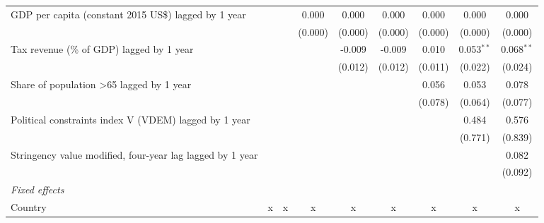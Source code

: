 \begin{tabular}{lcccccccc}
   GDP per capita (constant 2015 US\$) lagged by 1 year                    &               &               & 0.000         & 0.000         & 0.000         & 0.000        & 0.000        & 0.000\\   
                                                                           &               &               & (0.000)       & (0.000)       & (0.000)       & (0.000)      & (0.000)      & (0.000)\\   
   Tax revenue (\% of GDP) lagged by 1 year                                &               &               &               & -0.009        & -0.009        & 0.010        & 0.053$^{**}$ & 0.068$^{**}$\\   
                                                                           &               &               &               & (0.012)       & (0.012)       & (0.011)      & (0.022)      & (0.024)\\   
   Share of population >65 lagged by 1 year                                &               &               &               &               &               & 0.056        & 0.053        & 0.078\\   
                                                                           &               &               &               &               &               & (0.078)      & (0.064)      & (0.077)\\   
   Political constraints index V (VDEM) lagged by 1 year                   &               &               &               &               &               &              & 0.484        & 0.576\\   
                                                                           &               &               &               &               &               &              & (0.771)      & (0.839)\\   
   Stringency value modified, four-year lag lagged by 1 year               &               &               &               &               &               &              &              & 0.082\\   
                                                                           &               &               &               &               &               &              &              & (0.092)\\   
   \emph{Fixed effects}\\
   Country                                                                 & x             & x             & x             & x             & x             & x            & x            & x\\  

\end{tabular}
